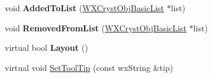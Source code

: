 \begin{DoxyCompactItemize}
void {\bfseries Added\+To\+List} (\mbox{\hyperlink{class_obj_cryst_1_1_w_x_cryst_obj_basic_list}{W\+X\+Cryst\+Obj\+Basic\+List}} $\ast$list)
\item 
\mbox{\label{class_obj_cryst_1_1_w_x_cryst_obj_basic_a87cdcff02c930ba9aaaf68569c22b26c}} 
void {\bfseries Removed\+From\+List} (\mbox{\hyperlink{class_obj_cryst_1_1_w_x_cryst_obj_basic_list}{W\+X\+Cryst\+Obj\+Basic\+List}} $\ast$list)
\item 
\mbox{\label{class_obj_cryst_1_1_w_x_cryst_obj_basic_a53828e8402ba42d27c5a770c64255dfe}} 
virtual bool {\bfseries Layout} ()
\item 
virtual void \mbox{\hyperlink{class_obj_cryst_1_1_w_x_cryst_obj_basic_a5c9a899add88c6e464e6b76f67b8e184}{Set\+Tool\+Tip}} (const wx\+String \&tip)
\end{DoxyCompactItemize}
